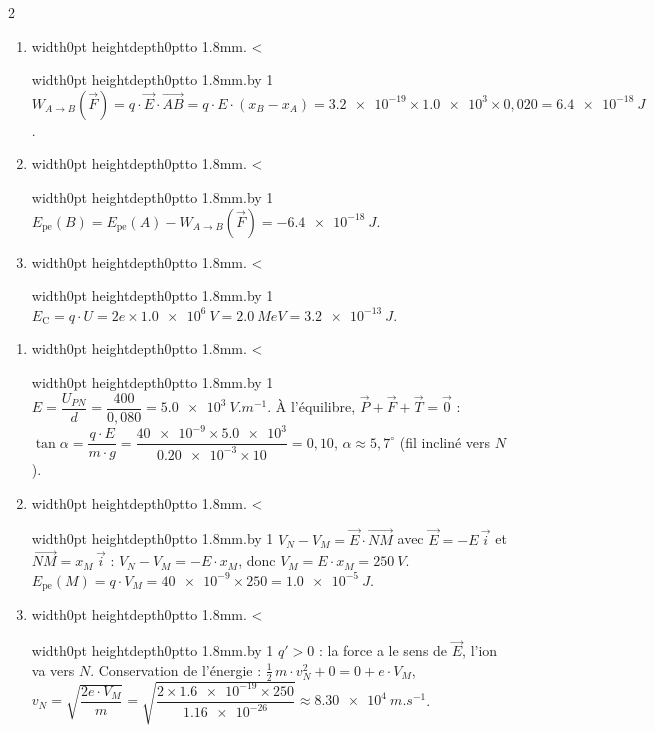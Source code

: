 \documentclass[11pt,a4paper]{article}
\newcommand{\vect}[1]{\overrightarrow{#1}}
\newcommand{\Ec}{E_{\mathrm{C}}}
\newif\ifeleve
\newlength{\interligne}\setlength{\interligne}{7mm}
\newlength{\replen}
\newcommand{\pointilles}{{\color{cInk2!60}\leaders\hbox to 1.8mm{\hss.\hss}\hfill}\kern0pt}
\newcommand{\lignes}[1]{\leavevmode\vrule width0pt height\dimexpr\interligne-1mm\relax depth0pt\pointilles
  \lgn=1 \loop\ifnum\lgn<#1 \par\nointerlineskip\noindent\vrule width0pt height\interligne depth0pt\pointilles\advance\lgn by 1 \repeat}
\newcommand{\rep}[1]{%
  \ifeleve
    \sbox{\repbox}{\parbox{\linewidth}{#1}}%
    \replen=\dimexpr\ht\repbox+\dp\repbox\relax
    \repn=\numexpr\replen/\baselineskip+1\relax
    \ifnum\repn<2 \repn=2\fi
    \edef\nblignes{\the\repn}\lignes{\nblignes}%
  \else #1\fi}
\newcommand{\Epe}{E_{\mathrm{pe}}}
\newcommand{\W}[2]{W_{#1\rightarrow #2}(\vect{F})}
\begin{document}
\begin{multicols}{2}
\begin{enumerate}[label={\sffamily\bfseries\arabic*.},leftmargin=5mm,itemsep=1pt]
  \item \rep{$\W{A}{B} = q\cdot\vect{E}\cdot\vect{AB} = q\cdot E\cdot(x_B - x_A) = \num{3,2e-19}\times\num{1,0e3}\times0{,}020 = \qty{6,4e-18}{J}$.}
  \item \rep{$\Epe(B) = \Epe(A) - \W{A}{B} = \qty{-6,4e-18}{J}$.}
  \item \rep{$\Ec = q\cdot U = 2e\times\qty{1,0e6}{V} = \qty{2,0}{MeV} = \qty{3,2e-13}{J}$.}
\end{enumerate}

\begin{enumerate}[label={\sffamily\bfseries\arabic*.},leftmargin=5mm,itemsep=1pt]
  \item \rep{$E = \dfrac{U_{PN}}{d} = \dfrac{400}{0{,}080} = \qty{5,0e3}{V.m^{-1}}$. À l’équilibre, $\vect{P} + \vect{F} + \vect{T} = \vect{0}$ : $\tan\alpha = \dfrac{q\cdot E}{m\cdot g} = \dfrac{\num{40e-9}\times\num{5,0e3}}{\num{0,20e-3}\times10} = 0{,}10$, $\alpha \approx 5{,}7^\circ$ (fil incliné vers $N$).}
  \item \rep{$V_N - V_M = \vect{E}\cdot\vect{NM}$ avec $\vect{E} = -E\,\vect{i}$ et $\vect{NM} = x_M\,\vect{i}$ : $V_N - V_M = -E\cdot x_M$, donc $V_M = E\cdot x_M = \qty{250}{V}$. $\Epe(M) = q\cdot V_M = \num{40e-9}\times250 = \qty{1,0e-5}{J}$.}
  \item \rep{$q' > 0$ : la force a le sens de $\vect{E}$, l’ion va vers $N$. Conservation de l’énergie : $\frac{1}{2}\,m\cdot v_N^2 + 0 = 0 + e\cdot V_M$,\\ $v_N = \sqrt{\dfrac{2e\cdot V_M}{m}} = \sqrt{\dfrac{2\times\num{1,6e-19}\times250}{\num{1,16e-26}}} \approx \qty{8,30e4}{m.s^{-1}}$.}
\end{enumerate}
\end{multicols}
\end{document}
